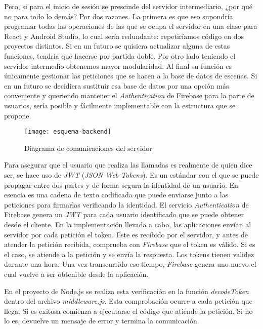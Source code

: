 Pero, si para el inicio de sesión se prescinde del servidor intermediario, ¿por qué no para todo lo demás? Por dos razones. La primera es que eso supondría programar todas las operaciones de las que se ocupa el servidor en una clase para React y Android Studio, lo cual sería redundante: repetiríamos código en dos proyectos distintos. Si en un futuro se quisiera actualizar alguna de estas funciones, tendría que hacerse por partida doble. Por otro lado teniendo el servidor intermedio obtenemos mayor modularidad. Al final su función es únicamente gestionar las peticiones que se hacen a la base de datos de escenas. Si en un futuro se decidiera sustituir esa base de datos por una opción más conveniente y queriendo mantener el \textit{Authentication} de Firebase para la parte de usuarios, sería posible y fácilmente implementable con la estructura que se propone.

\begin{figure}[h]
    \centering
    \texttt{[image: esquema-backend]}
    \caption[Diagrama de comunicaciones del servidor]{Diagrama de comunicaciones del servidor}
\end{figure}

Para asegurar que el usuario que realiza las llamadas es realmente de quien dice ser, se hace uso de \textit{JWT} (\textit{JSON Web Tokens}). Es un estándar con el que se puede propagar entre dos partes y de forma segura la identidad de un usuario. En esencia es una cadena de texto codificada que puede enviarse junto a las peticiones para firmarlas verificando la identidad. El servicio \textit{Authentication} de Firebase genera un \textit{JWT} para cada usuario identificado que se puede obtener desde el cliente. En la implementación llevada a cabo, las aplicaciones envían al servidor por cada petición el token. Este es recibido por el servidor, y antes de atender la petición recibida, comprueba con \textit{Firebase} que el token es válido. Si es el caso, se atiende a la petición y se envía la respuesta. Los tokens tienen validez durante una hora. Una vez transcurrido ese tiempo, \textit{Firebase} genera uno nuevo el cual vuelve a ser obtenible desde la aplicación.

En el proyecto de Node.js se realiza esta verificación en la función \textit{decodeToken} dentro del archivo \textit{middleware.js}. Esta comprobación ocurre a cada petición que llega. Si es exitosa comienza a ejecutarse el código que atiende la petición. Si no lo es, devuelve un mensaje de error y termina la comunicación.